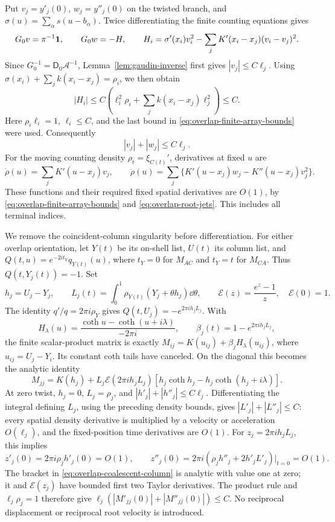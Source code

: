 Put \(v_j=y'_j(0)\), \(w_j=y''_j(0)\) on the twisted branch, and
\(\sigma(u)=\sum_\alpha s(u-b_\alpha)\).
Twice differentiating the finite counting equations gives
\[
 G_0v=\pi^{-1}\mathbf1,\qquad G_0w=-H,\qquad
 H_i=\sigma'(x_i)v_i^2
       -\sum_jK'(x_i-x_j)(v_i-v_j)^2.
\]
Since \(G_0^{-1}=\mathsf D_0\mathcal A^{-1}\),
Lemma~\ref{lem:gaudin-inverse} first gives \(|v_j|\le C\ell_j\).
Using \(\sigma(x_i)+\sum_j k(x_i-x_j)=\rho_i\), we then obtain
\[
 |H_i|\le C\left(\ell_i^2\rho_i+
                         \sum_j k(x_i-x_j)\ell_j^2\right)\le C.
\]
Here \(\rho_i\ell_i=1\), \(\ell_i\le C\), and the last bound in
\eqref{eq:overlap-finite-array-bounds} were used. Consequently
\begin{equation}\label{eq:overlap-root-jets}
 |v_j|+|w_j|\le C\ell_j.
\end{equation}
For the moving counting density \(\rho_t=\xi_{C(t)}'\), derivatives
at fixed \(u\) are
\[
 \dot\rho(u)=\sum_jK'(u-x_j)v_j,\qquad
 \ddot\rho(u)=\sum_j\{K'(u-x_j)w_j-K''(u-x_j)v_j^2\}.
\]
These functions and their required fixed spatial derivatives are
\(O(1)\), by \eqref{eq:overlap-finite-array-bounds} and
\eqref{eq:overlap-root-jets}. This includes all terminal indices.

We remove the coincident-column singularity before differentiation.
For either overlap orientation, let \(Y(t)\) be its on-shell list,
\(U(t)\) its column list, and
\(Q(t,u)=e^{-2it_Y}q_{Y(t)}(u)\), where \(t_Y=0\) for \(M_{AC}\)
and \(t_Y=t\) for \(M_{CA}\). Thus \(Q(t,Y_j(t))=-1\).
Set
\[
 h_j=U_j-Y_j,\qquad
 L_j(t)=\int_0^1\rho_{Y(t)}(Y_j+\theta h_j)\dd\theta,
 \qquad \mathcal E(z)=\frac{e^z-1}{z},\quad \mathcal E(0)=1.
\]
The identity \(q'/q=2\pi i\rho_Y\) gives
\(Q(t,U_j)=-e^{2\pi i h_jL_j}\). With
\[
 H_\lambda(u)=\frac{\coth u-\coth(u+i\lambda)}{-2\pi i},
 \qquad \beta_j(t)=1-e^{2\pi i h_jL_j},
\]
the finite scalar-product matrix is exactly
\(M_{ij}=K(u_{ij})+\beta_jH_\lambda(u_{ij})\),
where \(u_{ij}=U_j-Y_i\). Its constant coth tails have canceled.
On the diagonal this becomes the analytic identity
\begin{equation}\label{eq:overlap-coalescent-column}
 M_{jj}=K(h_j)+L_j\mathcal E(2\pi i h_jL_j)
       [h_j\coth h_j-h_j\coth(h_j+i\lambda)].
\end{equation}
At zero twist, \(h_j=0\), \(L_j=\rho_j\), and
\(|h'_j|+|h''_j|\le C\ell_j\).
Differentiating the integral defining \(L_j\), using the preceding
density bounds, gives \(|L'_j|+|L''_j|\le C\): every spatial
density derivative is multiplied by a velocity or acceleration
\(O(\ell_j)\), and the fixed-position time derivatives are \(O(1)\).
For \(z_j=2\pi i h_jL_j\), this implies
\[
 z'_j(0)=2\pi i\rho_jh'_j(0)=O(1),\qquad
 z''_j(0)=2\pi i(\rho_jh''_j+2h'_jL'_j)\big|_{t=0}=O(1).
\]
The bracket in \eqref{eq:overlap-coalescent-column} is analytic
with value one at zero; it and \(\mathcal E(z_j)\) have bounded first two
Taylor derivatives. The product rule and \(\ell_j\rho_j=1\) therefore
give \(\ell_j(|M'_{jj}(0)|+|M''_{jj}(0)|)\le C\).
No reciprocal displacement or reciprocal root velocity is introduced.

